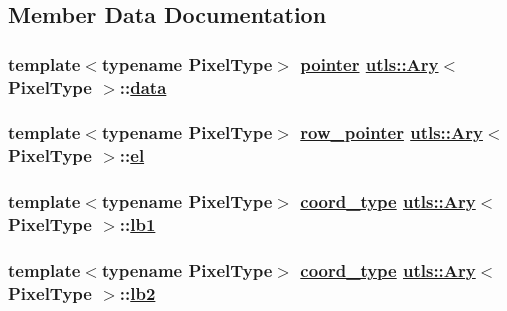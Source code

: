 \subsection{Member Data Documentation}
\hypertarget{structutls_1_1Ary_b81d2c654c158ec22caf28760e40ba88}{
\subsubsection[data]{\setlength{\rightskip}{0pt plus 5cm}template$<$typename Pixel\-Type$>$ \hyperlink{structutls_1_1Ary_9eb735fe995ca9b5faaef9b176a08583}{pointer} \hyperlink{structutls_1_1Ary}{utls::Ary}$<$ Pixel\-Type $>$::\hyperlink{structutls_1_1Ary_b81d2c654c158ec22caf28760e40ba88}{data}}}
\label{structutls_1_1Ary_b81d2c654c158ec22caf28760e40ba88}


\hypertarget{structutls_1_1Ary_c0088e9634850c0f123ab944550a6626}{
\subsubsection[el]{\setlength{\rightskip}{0pt plus 5cm}template$<$typename Pixel\-Type$>$ \hyperlink{structutls_1_1Ary_d8034949f0a70efaf950686c9cd7e7ea}{row\_\-pointer} \hyperlink{structutls_1_1Ary}{utls::Ary}$<$ Pixel\-Type $>$::\hyperlink{structutls_1_1Ary_c0088e9634850c0f123ab944550a6626}{el}}}
\label{structutls_1_1Ary_c0088e9634850c0f123ab944550a6626}


\hypertarget{structutls_1_1Ary_2cfc3bd4977117dc851cdaae635aa245}{
\subsubsection[lb1]{\setlength{\rightskip}{0pt plus 5cm}template$<$typename Pixel\-Type$>$ \hyperlink{structutls_1_1Ary_907420b899d180bd0ae87c3995316f18}{coord\_\-type} \hyperlink{structutls_1_1Ary}{utls::Ary}$<$ Pixel\-Type $>$::\hyperlink{structutls_1_1Ary_2cfc3bd4977117dc851cdaae635aa245}{lb1}}}
\label{structutls_1_1Ary_2cfc3bd4977117dc851cdaae635aa245}


\hypertarget{structutls_1_1Ary_b6147e63dabd77b245d6bc9ec976453d}{
\subsubsection[lb2]{\setlength{\rightskip}{0pt plus 5cm}template$<$typename Pixel\-Type$>$ \hyperlink{structutls_1_1Ary_907420b899d180bd0ae87c3995316f18}{coord\_\-type} \hyperlink{structutls_1_1Ary}{utls::Ary}$<$ Pixel\-Type $>$::\hyperlink{structutls_1_1Ary_b6147e63dabd77b245d6bc9ec976453d}{lb2}}}
\label{structutls_1_1Ary_b6147e63dabd77b245d6bc9ec976453d}


